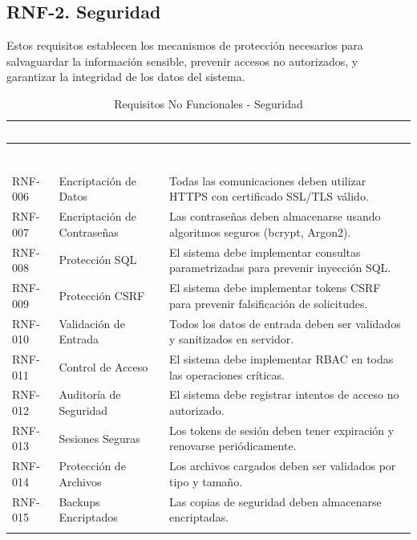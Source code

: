 \documentclass[12pt,a4paper]{article}
\begin{document}
\subsection{RNF-2. Seguridad}

Estos requisitos establecen los mecanismos de protección necesarios para salvaguardar la información sensible, prevenir accesos no autorizados, y garantizar la integridad de los datos del sistema.

\begin{longtable}{|>{\centering\arraybackslash}p{1.5cm}|>{\raggedright\arraybackslash}p{3.5cm}|>{\raggedright\arraybackslash}p{9cm}|}
\hline
\rowcolor{headercolor}
\textcolor{white}{\textbf{ID}} & \textcolor{white}{\textbf{Requisito}} & \textcolor{white}{\textbf{Descripción}} \\
\hline
\endfirsthead

\multicolumn{3}{c}{\textit{Continuación de la tabla anterior}} \\
\hline
\rowcolor{headercolor}
\textcolor{white}{\textbf{ID}} & \textcolor{white}{\textbf{Requisito}} & \textcolor{white}{\textbf{Descripción}} \\
\hline
\endhead

\hline
\multicolumn{3}{r}{\textit{Continúa en la siguiente página}} \\
\endfoot

\hline
\endlastfoot

RNF-006 & Encriptación de Datos & Todas las comunicaciones deben utilizar HTTPS con certificado SSL/TLS válido. \\
\hline
\rowcolor{rowgray}
RNF-007 & Encriptación de Contraseñas & Las contraseñas deben almacenarse usando algoritmos seguros (bcrypt, Argon2). \\
\hline
RNF-008 & Protección SQL & El sistema debe implementar consultas parametrizadas para prevenir inyección SQL. \\
\hline
\rowcolor{rowgray}
RNF-009 & Protección CSRF & El sistema debe implementar tokens CSRF para prevenir falsificación de solicitudes. \\
\hline
RNF-010 & Validación de Entrada & Todos los datos de entrada deben ser validados y sanitizados en servidor. \\
\hline
\rowcolor{rowgray}
RNF-011 & Control de Acceso & El sistema debe implementar RBAC en todas las operaciones críticas. \\
\hline
RNF-012 & Auditoría de Seguridad & El sistema debe registrar intentos de acceso no autorizado. \\
\hline
\rowcolor{rowgray}
RNF-013 & Sesiones Seguras & Los tokens de sesión deben tener expiración y renovarse periódicamente. \\
\hline
RNF-014 & Protección de Archivos & Los archivos cargados deben ser validados por tipo y tamaño. \\
\hline
\rowcolor{rowgray}
RNF-015 & Backups Encriptados & Las copias de seguridad deben almacenarse encriptadas. \\
\hline
\caption{Requisitos No Funcionales - Seguridad}
\end{longtable}
\end{document}
